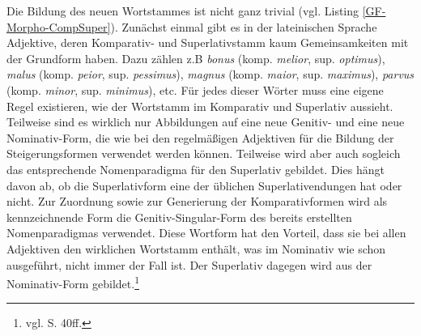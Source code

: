 Die Bildung des neuen Wortstammes ist nicht ganz trivial (vgl. Listing \ref{GF-Morpho-CompSuper}). Zunächst einmal gibt es in der lateinischen Sprache Adjektive, deren Komparativ- und Superlativstamm kaum Gemeinsamkeiten mit der Grundform haben. Dazu zählen z.B \textit{bonus} (komp. \textit{melior}, sup. \textit{optimus}), \textit{malus} (komp. \textit{peior}, sup. \textit{pessimus}), \textit{magnus} (komp. \textit{maior}, sup. \textit{maximus}), \textit{parvus} (komp. \textit{minor}, sup. \textit{minimus}), etc. Für jedes dieser Wörter muss eine eigene Regel existieren, wie der Wortstamm im Komparativ und Superlativ aussieht. Teilweise sind es wirklich nur Abbildungen auf eine neue Genitiv- und eine neue Nominativ-Form, die wie bei den regelmäßigen Adjektiven für die Bildung der Steigerungsformen verwendet werden können. Teilweise wird aber auch sogleich das entsprechende Nomenparadigma für den Superlativ gebildet. Dies hängt davon ab, ob die Superlativform eine der üblichen Superlativendungen hat oder nicht. Zur Zuordnung sowie zur Generierung der Komparativformen wird als kennzeichnende Form die Genitiv-Singular-Form des bereits erstellten Nomenparadigmas verwendet. Diese Wortform hat den Vorteil, dass sie bei allen Adjektiven den wirklichen Wortstamm enthält, was im Nominativ wie schon ausgeführt, nicht immer der Fall ist. Der Superlativ dagegen wird aus der Nominativ-Form gebildet.\footnote{vgl. \cite{BAYER-LINDAUER1994} S. 40ff.} \par
